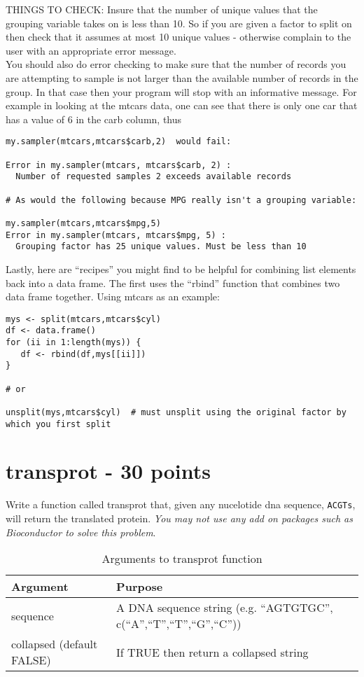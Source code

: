 \documentclass{article}
\begin{document}
THINGS TO CHECK: Insure that the number of unique values that the grouping variable takes on is less than 10. So if you are given a factor to split on then check that it assumes at most 10 unique values - otherwise complain to the user with an appropriate error message. 
\\

You should also do error checking to make sure that the number of records you are attempting to sample is not larger than the available number of records in the group. In that case then your program will stop with an informative message. For example in looking at the mtcars data, one can see that there is only one car that has a value of 6 in the carb column, thus
\begin{verbatim}
my.sampler(mtcars,mtcars$carb,2)  would fail:

Error in my.sampler(mtcars, mtcars$carb, 2) : 
  Number of requested samples 2 exceeds available records 

# As would the following because MPG really isn't a grouping variable:

my.sampler(mtcars,mtcars$mpg,5)
Error in my.sampler(mtcars, mtcars$mpg, 5) : 
  Grouping factor has 25 unique values. Must be less than 10
\end{verbatim}

Lastly, here are ``recipes'' you might find to be helpful for combining list elements back into a data frame. The first uses the ``rbind'' function that combines two data frame together. Using mtcars as an example:

\begin{verbatim}
mys <- split(mtcars,mtcars$cyl)
df <- data.frame()
for (ii in 1:length(mys)) {
   df <- rbind(df,mys[[ii]])
}

# or

unsplit(mys,mtcars$cyl)  # must unsplit using the original factor by which you first split

\end{verbatim}

\section{transprot - 30 points} Write a function called transprot that, given any nucelotide dna sequence, \texttt{ACGTs}, will return the translated protein. \emph{You may not use any add on packages such as Bioconductor to solve this problem}. 
\newline
\begin{table}[ht]
\caption{Arguments to transprot function}
\begin{tabular}{l | l}
\hline
Argument & Purpose \\ [1ex]
\hline
sequence & A DNA sequence string (e.g. ``AGTGTGC'', c(``A'',``T'',``T'',``G'',``C'')) \\ [1ex]
\hline  
collapsed (default FALSE) & If TRUE then return a collapsed string \\
\hline
\end{tabular}
\label{table:nonlin}
\end{table}
\end{document}
